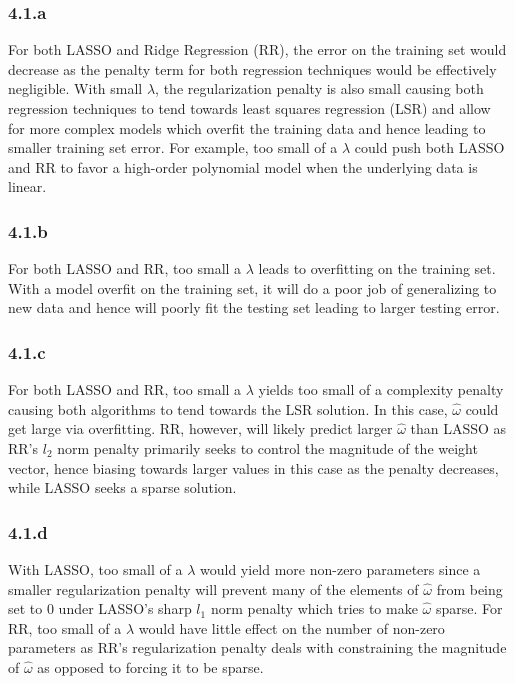 \documentclass[12pt]{amsart}
\begin{document}
\subsubsection*{4.1.a}
For both LASSO and Ridge Regression (RR), the error on the training set would decrease as the penalty term for both regression techniques would be effectively negligible.  With small $\lambda$, the regularization penalty is also small causing both regression techniques to tend towards least squares regression (LSR) and allow for more complex models which overfit the training data and hence leading to smaller training set error.  For example, too small of a $\lambda$ could push both LASSO and RR to favor a high-order polynomial model when the underlying data is linear.

\subsubsection*{4.1.b}
For both LASSO and RR, too small a $\lambda$ leads to overfitting on the training set.  With a model overfit on the training set, it will do a poor job of generalizing to new data and hence will poorly fit the testing set leading to larger testing error.

\subsubsection*{4.1.c}
For both LASSO and RR, too small a $\lambda$ yields too small of a complexity penalty causing both algorithms to tend towards the LSR solution.  In this case, $\hat{\omega}$ could get large via overfitting.  RR, however, will likely predict larger $\hat{\omega}$ than LASSO as RR's $l_2$ norm penalty primarily seeks to control the magnitude of the weight vector, hence biasing towards larger values in this case as the penalty decreases, while LASSO seeks a sparse solution.


\subsubsection*{4.1.d}
With LASSO, too small of a $\lambda$ would yield more non-zero parameters since a smaller regularization penalty will prevent many of the elements of $\hat{\omega}$ from being set to 0 under LASSO's sharp $l_1$ norm penalty which tries to make $\hat{\omega}$ sparse.  For RR, too small of a $\lambda$ would have little effect on the number of non-zero parameters as RR's regularization penalty deals with constraining the magnitude of $\hat{\omega}$ as opposed to forcing it to be sparse.
\end{document}
